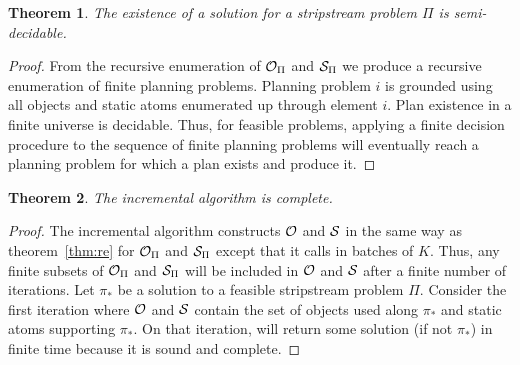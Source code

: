 \documentclass[letterpaper]{article} %
\newcommand\note[1]{\todo[inline, color=blue!10, linecolor=blue!90,
  size=\footnotesize]{\linespread{0.9}\selectfont{{\bf CRG:} #1}\par}}
\theoremstyle{plain}\newtheorem{thm}{Theorem}
\theoremstyle{definition}\newtheorem{defn}{Definition}
\theoremstyle{plain}\newtheorem{lem}{Lemma}
\theoremstyle{plain}\newtheorem{cor}{Corollary}
\newcommand{\algname}{{\sc strips}tream}
\newcommand{\eager}{incremental}
\begin{document}
\begin{thm}
The existence of a solution for a \algname{} problem $\Pi$ is
semi-decidable. 
\end{thm}
\begin{proof}
From the recursive enumeration of ${\cal O}_\Pi$ and ${\cal S}_\Pi$ we produce a
recursive enumeration of finite planning problems. Planning problem
$i$ is grounded using all objects and static atoms enumerated up through element $i$.
Plan existence in a finite universe is decidable. 
Thus, for feasible problems, applying a finite decision procedure to the sequence of finite planning problems
will eventually reach a planning problem for which a plan exists and
produce it.
\end{proof}

\begin{thm}
The \eager{} algorithm is complete.
\end{thm}
\begin{proof}
The \eager{} algorithm constructs ${\cal O}$ and ${\cal S}$ in the same way 
as theorem~\ref{thm:re} for ${\cal O}_\Pi$ and ${\cal S}_\Pi$ %
except that it 
calls  in batches of $K$. 
Thus, any finite subsets of 
${\cal O}_\Pi$ and ${\cal S}_\Pi$ will be included in ${\cal O}$ and ${\cal S}$
after a finite number of iterations.
Let $\pi_*$ be a solution to a feasible \algname{} problem $\Pi$.
Consider the first iteration where ${\cal O}$ and ${\cal S}$ contain the set of objects used along $\pi_*$ and static atoms supporting $\pi_*$.
On that iteration,  will return some solution (if not $\pi_*$) in finite time because it is sound and complete.
\end{proof}
\end{document}
